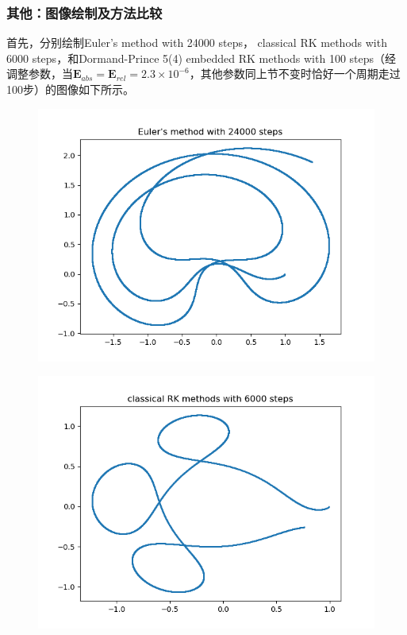 \documentclass{ctexart}
\begin{document}
\begin{sloppypar}
\subsubsection{其他：图像绘制及方法比较}
首先，分别绘制Euler's method with 24000 steps， classical RK methods with 6000 steps，和Dormand-Prince 5(4) embedded RK methods with 100 steps（经调整参数，当$\mathbf{E}_{abs}=\mathbf{E}_{rel}=2.3 \times 10^{-6}$，其他参数同上节不变时恰好一个周期走过100步）的图像如下所示。
\begin{figure}[H]
\centering
\includegraphics[scale = 0.45]{./report_src/Figure_37.png}
\end{figure}
\begin{figure}[H]
\centering
\includegraphics[scale = 0.45]{./report_src/Figure_38.png}

\end{figure}
\end{sloppypar}
\end{document}
